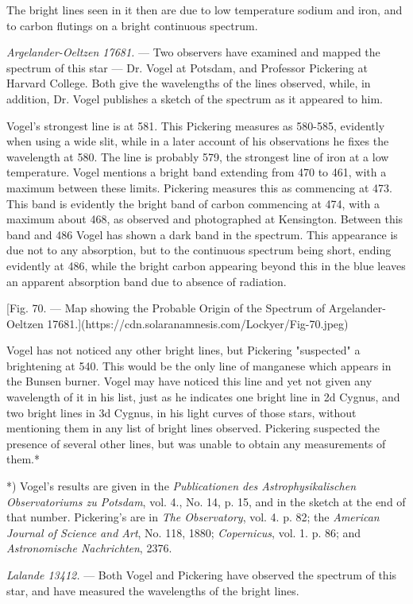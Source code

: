 \documentclass[a4paper, 12pt, oneside, polutonikogreek, english]{article}
\begin{document}
The bright lines seen in it then are due to low temperature sodium and iron, and to carbon flutings on a bright continuous spectrum.

\emph{Argelander-Oeltzen 17681.} --- Two observers have examined and mapped the spectrum of this star --- Dr. Vogel at Potsdam, and Professor Pickering at Harvard College. Both give the wavelengths of the lines observed, while, in addition, Dr. Vogel publishes a sketch of the spectrum as it appeared to him.

Vogel's strongest line is at 581. This Pickering measures as 580-585, evidently when using a wide slit, while in a later account of his observations he fixes the wavelength at 580. The line is probably 579, the strongest line of iron at a low temperature. Vogel mentions a bright band extending from 470 to 461, with a maximum between these limits. Pickering measures this as commencing at 473. This band is evidently the bright band of carbon commencing at 474, with a maximum about 468, as observed and photographed at Kensington. Between this band and 486 Vogel has shown a dark band in the spectrum. This appearance is due not to any absorption, but to the continuous spectrum being short, ending evidently at 486, while the bright carbon appearing beyond this in the blue leaves an apparent absorption band due to absence of radiation.

[Fig. 70. --- Map showing the Probable Origin of the Spectrum of Argelander-Oeltzen 17681.](https://cdn.solaranamnesis.com/Lockyer/Fig-70.jpeg)

Vogel has not noticed any other bright lines, but Pickering "suspected" a brightening at 540. This would be the only line of manganese which appears in the Bunsen burner. Vogel may have noticed this line and yet not given any wavelength of it in his list, just as he indicates one bright line in 2d Cygnus, and two bright lines in 3d Cygnus, in his light curves of those stars, without mentioning them in any list of bright lines observed. Pickering suspected the presence of several other lines, but was unable to obtain any measurements of them.*

*) Vogel's results are given in the \emph{Publicationen des Astrophysikalischen Observatoriums zu Potsdam}, vol. 4., No. 14, p. 15, and in the sketch at the end of that number. Pickering's are in \emph{The Observatory}, vol. 4. p. 82; the \emph{American Journal of Science and Art}, No. 118, 1880; \emph{Copernicus}, vol. 1. p. 86; and \emph{Astronomische Nachrichten}, 2376.

\emph{Lalande 13412.} --- Both Vogel and Pickering have observed the spectrum of this star, and have measured the wavelengths of the bright lines.
\end{document}
